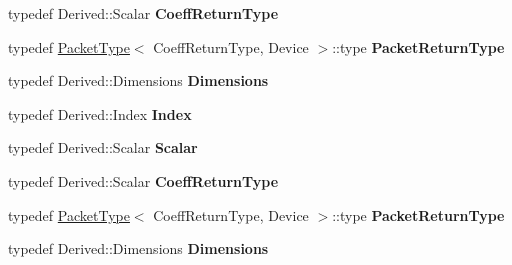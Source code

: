 \begin{DoxyCompactItemize}
typedef Derived\+::\+Scalar {\bfseries Coeff\+Return\+Type}
\item 
\mbox{\label{struct_eigen_1_1_tensor_evaluator_3_01const_01_tensor_ref_3_01_derived_01_4_00_01_device_01_4_aa11aece89ddd7df04d8bf4fe6a64d071}} 
typedef \hyperlink{struct_eigen_1_1_packet_type}{Packet\+Type}$<$ Coeff\+Return\+Type, Device $>$\+::type {\bfseries Packet\+Return\+Type}
\item 
\mbox{\label{struct_eigen_1_1_tensor_evaluator_3_01const_01_tensor_ref_3_01_derived_01_4_00_01_device_01_4_aa4e93e0ce97f233ccb8c0f25ff5d7e46}} 
typedef Derived\+::\+Dimensions {\bfseries Dimensions}
\item 
\mbox{\label{struct_eigen_1_1_tensor_evaluator_3_01const_01_tensor_ref_3_01_derived_01_4_00_01_device_01_4_a0e6bc98067e911e670554cdd6e31a4a6}} 
typedef Derived\+::\+Index {\bfseries Index}
\item 
\mbox{\label{struct_eigen_1_1_tensor_evaluator_3_01const_01_tensor_ref_3_01_derived_01_4_00_01_device_01_4_a7501b639f2fb1a6f3ed79dad6db243ab}} 
typedef Derived\+::\+Scalar {\bfseries Scalar}
\item 
\mbox{\label{struct_eigen_1_1_tensor_evaluator_3_01const_01_tensor_ref_3_01_derived_01_4_00_01_device_01_4_aafcdefdaf0a7e3da98365da1d1d36081}} 
typedef Derived\+::\+Scalar {\bfseries Coeff\+Return\+Type}
\item 
\mbox{\label{struct_eigen_1_1_tensor_evaluator_3_01const_01_tensor_ref_3_01_derived_01_4_00_01_device_01_4_aa11aece89ddd7df04d8bf4fe6a64d071}} 
typedef \hyperlink{struct_eigen_1_1_packet_type}{Packet\+Type}$<$ Coeff\+Return\+Type, Device $>$\+::type {\bfseries Packet\+Return\+Type}
\item 
\mbox{\label{struct_eigen_1_1_tensor_evaluator_3_01const_01_tensor_ref_3_01_derived_01_4_00_01_device_01_4_aa4e93e0ce97f233ccb8c0f25ff5d7e46}} 
typedef Derived\+::\+Dimensions {\bfseries Dimensions}
\end{DoxyCompactItemize}
